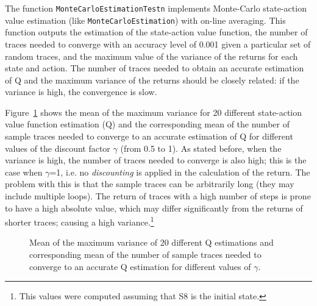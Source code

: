 \documentclass[11pt]{article}   	%
\begin{document}
The function \texttt{MonteCarloEstimationTestn} implements Monte-Carlo state-action value estimation (like \texttt{MonteCarloEstimation}) with on-line averaging. This function outputs the estimation of the state-action value function, the number of traces needed to converge with an accuracy level of 0.001 given a particular set of random traces, and the maximum value of the variance of the returns for each state and action. The number of traces needed to obtain an accurate estimation of Q and the maximum variance of the returns should be closely related: if the variance is high, the convergence is slow.

Figure~\ref{fig:maxvar} shows the mean of the maximum variance for 20 different state-action value function estimation (Q) and the corresponding mean of the number of sample traces needed to converge to an accurate estimation of Q for different values of the discount factor $\gamma$ (from 0.5 to 1). As stated before, when the variance is high, the number of traces needed to converge is also high; this is the case when $\gamma$=1, i.e. no \textit{discounting} is applied in the calculation of the return. The problem with this is that the sample traces can be arbitrarily long (they may include multiple loops). The return of traces with a high number of steps is prone to have a high absolute value, which may differ significantly from the returns of shorter traces; causing a high variance.\footnote{This values were computed assuming that S8 is the initial state.}

\begin{figure}
\centering
\setlength\fboxsep{0pt}
\setlength\fboxrule{0.5pt}
\caption{Mean of the maximum variance of 20 different Q estimations and corresponding mean of the number of sample traces needed to converge to an accurate Q estimation for different values of $\gamma$. \label{fig:maxvar}}
\end{figure}
\end{document}
